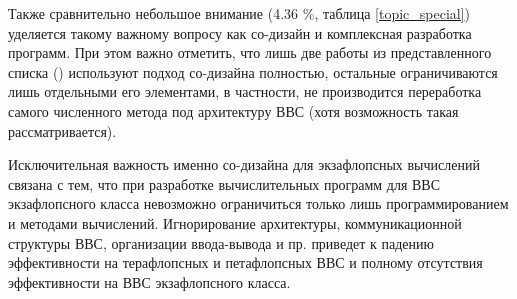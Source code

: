 Также сравнительно небольшое внимание (4.36 \%, таблица \ref{topic_special}) уделяется такому важному вопросу как со-дизайн  и комплексная разработка программ. При этом важно отметить, что лишь две работы из представленного списка (\cite{Emad2016,Subotic2013450}) используют подход со-дизайна полностью, остальные ограничиваются лишь отдельными его элементами, в частности, не производится переработка самого численного метода под архитектуру ВВС (хотя возможность такая рассматривается).

Исключительная важность именно со-дизайна для экзафлопсных вычислений связана с тем, что при разработке вычислительных программ для ВВС экзафлопсного класса невозможно ограничиться только лишь программированием и методами вычислений. Игнорирование архитектуры, коммуникационной структуры ВВС, организации ввода-вывода и пр. приведет к падению эффективности на терафлопсных и петафлопсных ВВС и полному отсутствия эффективности на ВВС экзафлопсного класса.
